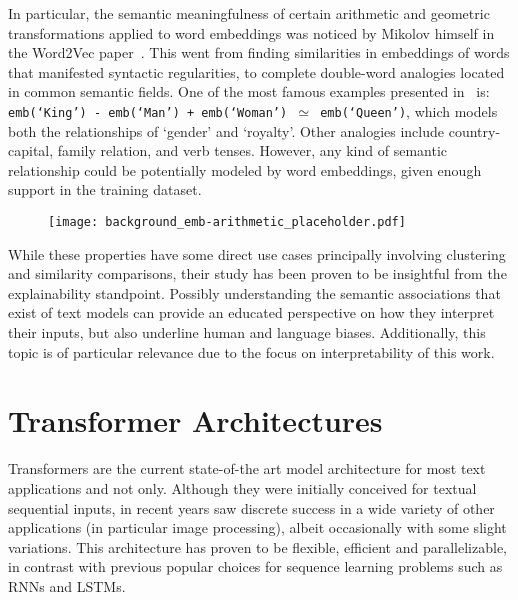 In particular, the semantic meaningfulness of certain arithmetic and geometric transformations applied to word embeddings was noticed by Mikolov himself in the Word2Vec paper~\cite{mikolov2013}.
This went from finding similarities in embeddings of words that manifested syntactic regularities, to complete double-word analogies located in common semantic fields.
One of the most famous examples presented in~\cite{mikolov2013} is: \texttt{emb(`King') - emb(`Man') + emb(`Woman') $\simeq$ emb(`Queen')}, which models both the relationships of `gender' and `royalty'.
Other  analogies include country-capital, family relation, and verb tenses.
However, any kind of semantic relationship could be potentially modeled by word embeddings, given enough support in the training dataset.

\begin{figure}[t!]
    \centering
    \texttt{[image: background\_emb-arithmetic\_placeholder.pdf]}
    \caption{}
    \label{fig:background_emb-arithmetic}
\end{figure}

While these properties have some direct use cases principally involving clustering and similarity comparisons, their study has been proven to be insightful from the explainability standpoint.
Possibly understanding the semantic associations that exist  of text models can provide an educated perspective on how they interpret their inputs, but also underline human and language biases.
Additionally, this topic is of particular relevance due to the focus on interpretability of this work.

\section{Transformer Architectures}

Transformers are the current state-of-the art model architecture for most text applications and not only.
Although they were initially conceived for textual sequential inputs, in recent years saw discrete success in a wide variety of other applications (in particular image processing), albeit occasionally with some slight variations.
This architecture has proven to be flexible, efficient and parallelizable, in contrast with previous popular choices for sequence learning problems such as RNNs and LSTMs.


